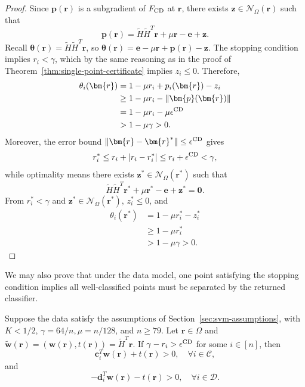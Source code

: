 \documentclass[twoside,11pt]{article}
\newcommand\bz{\bm{0}}
\newcommand{\btheta}{\bm{\theta}}
\renewcommand{\c}{\bm{c}}
\renewcommand{\d}{\bm{d}}
\newcommand\p{\bm{p}}
\renewcommand\r{\bm{r}}
\newcommand\w{\bm{w}}
\newcommand\z{\bm{z}}
\newcommand\e{\bm{e}}
\newcommand\CC{\mathcal{C}}
\newcommand\DD{\mathcal{D}}
\newcommand\mN{\mathcal{N}}
\newcommand\tw{\tilde{\w}}
\newcommand\tH{\tilde{H}}
\begin{document}
    \begin{proof}
        Since $\p(\r)$ is a subgradient of $F_{\rm CD}$ at $\r$, there exists $\z\in \mN_\Omega(\r)$ such that
        \[
            \p(\r) = \tH\tH^T\r + \mu\r - \e + \z.
        \]
        Recall $\btheta(\r) = \tH\tH^T\r$, so $\btheta(\r) = \e - \mu\r + \p(\r) - \z$. The stopping condition implies $r_i < \gamma$, which by the same reasoning as in the proof of Theorem~\ref{thm:single-point-certificate} implies $z_i\leq0$. Therefore,
        \begin{align*}
            \theta_i(\r) &= 1 - \mu r_i + p_i(\r) - z_i\\
                         &\geq 1-\mu r_i - \|\p(\r)\|\\
                         &= 1 - \mu r_i - \mu\epsilon^{\rm CD}\\
                         &> 1 - \mu\gamma > 0.
        \end{align*}
        Moreover, the error bound $\|\r - \r^*\| \leq \epsilon^{\rm CD}$ gives
        \[
            r_i^* \leq r_i + |r_i - r_i^*| \leq r_i + \epsilon^{\rm CD} < \gamma,
        \]
        while optimality means there exists $\z^* \in \mN_{\Omega}(\r^*)$ such that
        \[
            \tH\tH^T\r^* + \mu\r^* - \e + \z^* = \bz.
        \]
        From $r_i^* < \gamma$ and $\z^* \in \mN_{\Omega}(\r^*)$, $z_i^* \leq 0$, and
        \begin{align*}
            \theta_i(\r^*) &= 1 - \mu r_i^* - z_i^*\\
                           &\geq 1 - \mu r_i^*\\
                           &> 1 - \mu\gamma > 0.
        \end{align*}
    \end{proof}
    We may also prove that under the data model, one point satisfying the stopping condition implies all well-classified points must be separated by the returned classifier.
    \begin{theorem} \label{thm:CD-termination-correctness}
        Suppose the data satisfy the assumptions of Section~\ref{sec:svm-assumptions}, with $K<1/2$, $\gamma = 64/n, \mu = n/128$, and $n \geq 79$. Let $\r \in \Omega$ and $\tw(\r) = (\w(\r),t(\r)) = \tH^T\r$. If $\gamma - r_i > \epsilon^{\rm CD}$ for some $i \in [n]$, then
        \[
            \c_i^T\w(\r) + t(\r) > 0,\quad \forall i \in \CC,
        \]
        and
        \[
            -\d_i^T\w(\r) - t(\r) > 0,\quad \forall i \in \DD.
        \]
    \end{theorem}
\end{document}
